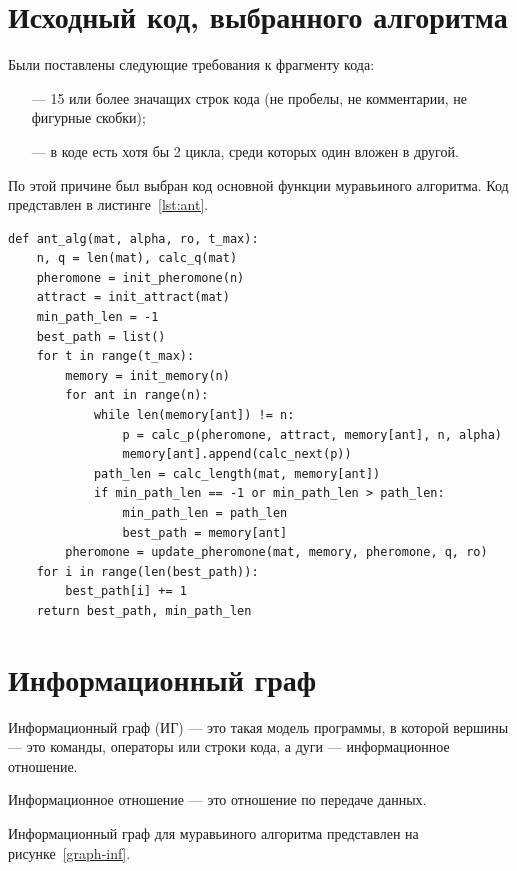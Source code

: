 \documentclass[a4paper, 12pt]{extreport}
\begin{document}
\chapter{Исходный код, выбранного алгоритма}

Были поставлены следующие требования к фрагменту кода:
\begin{itemize}
	\item[---] 15 или более значащих строк кода (не пробелы, не комментарии, не фигурные скобки);
	\item[---] в коде есть хотя бы 2 цикла, среди которых один вложен в другой.
\end{itemize}

По этой причине был выбран код основной функции муравьиного алгоритма. Код представлен в листинге~\ref{lst:ant}.

\begin{lstlisting}[style=python, label=lst:ant,caption=Муравьиный алгоритм]
def ant_alg(mat, alpha, ro, t_max):
    n, q = len(mat), calc_q(mat)
    pheromone = init_pheromone(n)
    attract = init_attract(mat)
    min_path_len = -1
    best_path = list()
    for t in range(t_max):
        memory = init_memory(n)
        for ant in range(n):
            while len(memory[ant]) != n:
                p = calc_p(pheromone, attract, memory[ant], n, alpha)
                memory[ant].append(calc_next(p))
            path_len = calc_length(mat, memory[ant])
            if min_path_len == -1 or min_path_len > path_len:
                min_path_len = path_len
                best_path = memory[ant]
        pheromone = update_pheromone(mat, memory, pheromone, q, ro)
    for i in range(len(best_path)):
        best_path[i] += 1
    return best_path, min_path_len
\end{lstlisting}

\chapter{Информационный граф}

Информационный граф (ИГ) --- это такая модель программы, в которой вершины --- это команды, операторы или строки кода, а дуги --- информационное отношение.

Информационное отношение --- это отношение по передаче данных.

Информационный граф для муравьиного алгоритма представлен на рисунке~\ref{graph-inf}.
\end{document}
